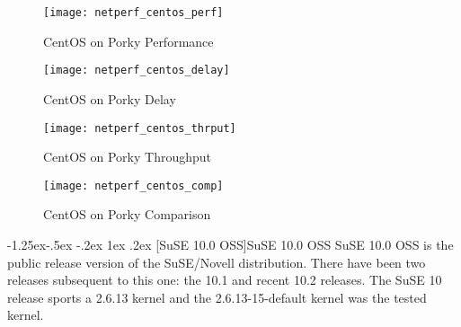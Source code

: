 \documentclass[letterpaper,final,notitlepage,twocolumn,10pt,twoside]{article}
\makeatletter
\renewcommand\subsubsection{\@startsection{subsubsection}{3}{\z@}%
                                     {-1.25ex\@plus -.5ex \@minus -.2ex}%
                                     {1ex \@plus .2ex}%
                                     {\normalfont\normalsize\bfseries}}
\makeatother
\begin{document}
\begin{figure}[p]
\center\texttt{[image: netperf\_centos\_perf]}
\caption[CentOS on Porky Performance]{CentOS on Porky Performance}
\label{figure:centosperf}
\end{figure}

\begin{figure}[p]
\center\texttt{[image: netperf\_centos\_delay]}
\caption[CentOS on Porky Delay]{CentOS on Porky Delay}
\label{figure:centosdly}
\end{figure}

\begin{figure}[p]
\center\texttt{[image: netperf\_centos\_thrput]}
\caption[CentOS on Porky Throughput]{CentOS on Porky Throughput}
\label{figure:centosthrput}
\end{figure}

\begin{figure}[p]
\center\texttt{[image: netperf\_centos\_comp]}
\caption[CentOS on Porky Comparison]{CentOS on Porky Comparison}
\label{figure:centoscomp}
\end{figure}

\subsubsection[SuSE 10.0 OSS]{SuSE 10.0 OSS}
SuSE 10.0 OSS is the public release version of the SuSE/Novell distribution.
There have been two releases subsequent to this one: the 10.1 and recent 10.2
releases.  The SuSE 10 release sports a 2.6.13 kernel and the
2.6.13-15-default kernel was the tested kernel.
\end{document}
